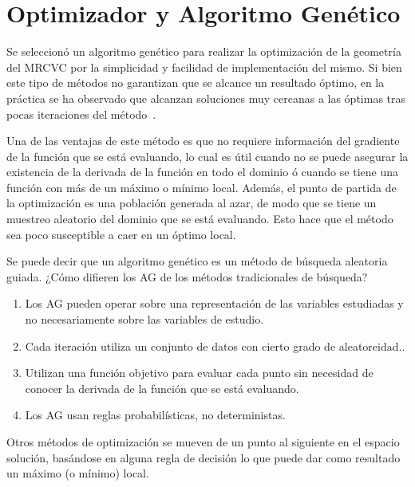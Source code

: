 \section{Optimizador y Algoritmo Genético}
%
%

Se seleccionó un algoritmo genético para realizar la optimización de la
geometría del MRCVC por la simplicidad y facilidad de implementación del mismo.
%
Si bien este tipo de métodos no garantizan que se alcance un resultado óptimo,
en la práctica se ha observado que alcanzan soluciones muy cercanas a las
óptimas tras pocas iteraciones del método~\parencite{goldberg}\parencite{shi}.

Una de las ventajas de este método es que no requiere información del gradiente
de la función que se está evaluando, lo cual es útil cuando no se puede asegurar
la existencia de la derivada de la función en todo el dominio ó cuando se tiene
una función con más de un máximo o mínimo local.
%
Además, el punto de partida de la optimización es una población generada al
azar, de modo que se tiene un muestreo aleatorio del dominio que se está
evaluando.
%
Esto hace que el método sea poco susceptible a caer en un óptimo local.

Se puede decir que un algoritmo genético es un método de búsqueda aleatoria
guiada.
%
¿Cómo difieren los AG de los métodos tradicionales de búsqueda?
%
\begin{enumerate}
  \item Los AG pueden operar sobre una representación de las variables estudiadas y
no necesariamente sobre las variables de estudio.
  \item Cada iteración utiliza un conjunto de datos con cierto grado de
aleatoreidad..
  \item Utilizan una función objetivo para evaluar cada punto sin necesidad de
conocer la derivada de la función que se está evaluando.
  \item Los AG usan reglas probabilísticas, no deterministas.
\end{enumerate}

Otros métodos de optimización se mueven de un punto al siguiente en el espacio
solución, basándose en alguna regla de decisión lo que puede dar como resultado
un máximo (o mínimo) local.

